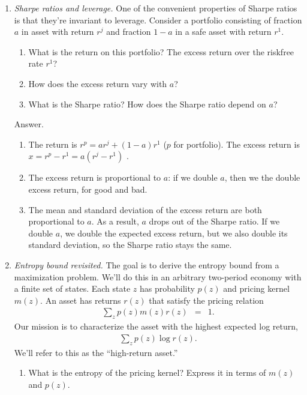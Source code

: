 \documentclass[11pt]{article}
\begin{document}
\begin{enumerate}
\item {\it Sharpe ratios and leverage.\/}
One of the convenient properties of Sharpe ratios is that they're invariant to leverage.
Consider a portfolio consisting of fraction $a$ in asset with return $r^j$ and
fraction $1-a$ in a safe asset with return $r^1$.
%
\begin{enumerate}
\item What is the return on this portfolio?
The excess return over the riskfree rate $r^1$?
\item How does the excess return vary with $a$?
\item What is the Sharpe ratio?
How does the Sharpe ratio depend on $a$?
\end{enumerate}
%
Answer.
\begin{enumerate}
\item The return is $r^p = a r^j + (1-a) r^1$ ($p$ for portfolio).
The excess return is $x = r^p - r^1 = a (r^j - r^1)$ .
\item The excess return is proportional to $a$:  if we double $a$,
then we the double excess return, for good and bad.
\item The mean and standard deviation of the excess return
are both proportional to $a$.
As a result, $a$ drops out of the Sharpe ratio.
If we double $a$, we double the expected excess return,
but we also double its standard deviation,
so the Sharpe ratio stays the same.
\end{enumerate}

\item {\it Entropy bound revisited.\/}
The goal is to derive the entropy bound from a maximization problem.
We'll do this in an arbitrary two-period economy with a finite set of states.
Each state $z$ has probability $p(z)$
and pricing kernel $m(z)$.
An asset has returns $r(z)$ that satisfy the pricing relation
\begin{eqnarray}
    \sum_z p(z) m(z) r(z) &=& 1.
    \label{eq:pricing-relation}
\end{eqnarray}
Our mission is to characterize the asset with the highest expected log return,
\begin{eqnarray*}
    \sum_z p(z) \log r(z) .
\end{eqnarray*}
We'll refer to this as the ``high-return asset.''
%
\begin{enumerate}
\item What is the entropy of the pricing kernel?
Express it in terms of $m(z)$ and $p(z)$.


\end{enumerate}
\end{enumerate}
\end{document}
